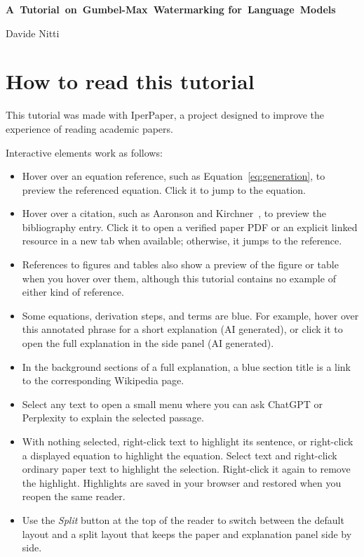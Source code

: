 \documentclass[11pt]{article}
\newcommand{\TutorialAuthor}{Davide Nitti}
\DeclareRobustCommand{\iperpaper}[2]{%
  \begingroup
  \hypersetup{pdfborder=0 0 0}%
  \href{iperpaper:#1}{{\color{iperpaperlink}#2}}%
  \endgroup
}
\def\iperpaper#1#2{#2}%
\begin{document}
\begin{center}
  \parbox{0.96\textwidth}{%
    \centering
    \fontsize{21}{28}\selectfont\bfseries\color{Lone}
    \mbox{A Tutorial on Gumbel-Max Watermarking}
    \mbox{for Language Models}\par
  }
  \vspace{0.75em}

  {\large \TutorialAuthor}
\end{center}

\vspace{1.0em}
\section*{How to read this tutorial}
This tutorial was made with IperPaper, a project designed to improve the experience of reading academic papers.

Interactive elements work as follows:
\begin{itemize}
\item Hover over an equation reference, such as Equation~\eqref{eq:generation}, to preview the referenced equation. Click it to jump to the equation.
\item Hover over a citation, such as Aaronson and Kirchner~\cite{aaronson2022}, to preview the bibliography entry. Click it to open a verified paper PDF or an explicit linked resource in a new tab when available; otherwise, it jumps to the reference.
\item References to figures and tables also show a preview of the figure or table when you hover over them, although this tutorial contains no example of either kind of reference.
\item Some equations, derivation steps, and terms are blue. For example, hover over \iperpaper{tutorial_annotation_example}{this annotated phrase} for a short explanation (AI generated), or click it to open the full explanation in the side panel (AI generated).
\item In the background sections of a full explanation, a blue section title is a link to the corresponding Wikipedia page.
\item Select any text to open a small menu where you can ask ChatGPT or Perplexity to explain the selected passage.
\item With nothing selected, right-click text to highlight its sentence, or right-click a displayed equation to highlight the equation. Select text and right-click ordinary paper text to highlight the selection. Right-click it again to remove the highlight. Highlights are saved in your browser and restored when you reopen the same reader.
\item Use the \emph{Split} button at the top of the reader to switch between the default layout and a split layout that keeps the paper and explanation panel side by side.
\end{itemize}
\end{document}
